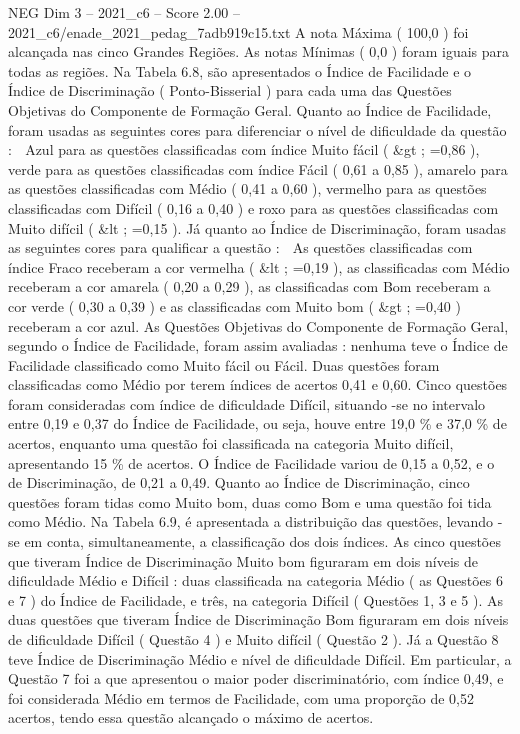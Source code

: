 \begin{textsample}{NEG Dim 3 – 2021\_c6 – Score 2.00 – 2021\_c6/enade\_2021\_pedag\_7adb919c15.txt}
A nota Máxima ( 100,0 ) foi alcançada nas cinco Grandes Regiões.
As notas Mínimas ( 0,0 ) foram iguais para todas as regiões.
Na Tabela 6.8, são apresentados o Índice de Facilidade e o Índice de Discriminação ( Ponto-Bisserial ) para cada uma das Questões Objetivas do Componente de Formação Geral.
Quanto ao Índice de Facilidade, foram usadas as seguintes cores para diferenciar o nível de dificuldade da questão :  Azul para as questões classificadas com índice Muito fácil ( \&gt ; =0,86 ), verde para as questões classificadas com índice Fácil ( 0,61 a 0,85 ), amarelo para as questões classificadas com Médio ( 0,41 a 0,60 ), vermelho para as questões classificadas com Difícil ( 0,16 a 0,40 ) e roxo para as questões classificadas com Muito difícil ( \&lt ; =0,15 ).
Já quanto ao Índice de Discriminação, foram usadas as seguintes cores para qualificar a questão :  As questões classificadas com índice Fraco receberam a cor vermelha ( \&lt ; =0,19 ), as classificadas com Médio receberam a cor amarela ( 0,20 a 0,29 ), as classificadas com Bom receberam a cor verde ( 0,30 a 0,39 ) e as classificadas com Muito bom ( \&gt ; =0,40 ) receberam a cor azul.
As Questões Objetivas do Componente de Formação Geral, segundo o Índice de Facilidade, foram assim avaliadas : nenhuma teve o Índice de Facilidade classificado como Muito fácil ou Fácil.
Duas questões foram classificadas como Médio por terem índices de acertos 0,41 e 0,60.
Cinco questões foram consideradas com índice de dificuldade Difícil, situando -se no intervalo entre 0,19 e 0,37 do Índice de Facilidade, ou seja, houve entre 19,0 \% e 37,0 \% de acertos, enquanto uma questão foi classificada na categoria Muito difícil, apresentando 15 \% de acertos.
O Índice de Facilidade variou de 0,15 a 0,52, e o de Discriminação, de 0,21 a 0,49.
Quanto ao Índice de Discriminação, cinco questões foram tidas como Muito bom, duas como Bom e uma questão foi tida como Médio.
Na Tabela 6.9, é apresentada a distribuição das questões, levando -se em conta, simultaneamente, a classificação dos dois índices.
As cinco questões que tiveram Índice de Discriminação Muito bom figuraram em dois níveis de dificuldade Médio e Difícil : duas classificada na categoria Médio ( as Questões 6 e 7 ) do Índice de Facilidade, e três, na categoria Difícil ( Questões 1, 3 e 5 ).
As duas questões que tiveram Índice de Discriminação Bom figuraram em dois níveis de dificuldade Difícil ( Questão 4 ) e Muito difícil ( Questão 2 ).
Já a Questão 8 teve Índice de Discriminação Médio e nível de dificuldade Difícil.
Em particular, a Questão 7 foi a que apresentou o maior poder discriminatório, com índice 0,49, e foi considerada Médio em termos de Facilidade, com uma proporção de 0,52 acertos, tendo essa questão alcançado o máximo de acertos.

\end{textsample}
